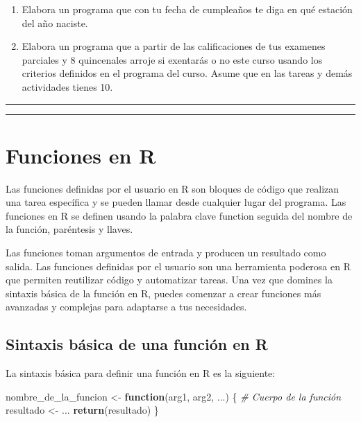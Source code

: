 \documentclass[
]{book}
\newenvironment{Shaded}{\begin{snugshade}}{\end{snugshade}}
\newcommand{\CommentTok}[1]{\textcolor[rgb]{0.56,0.35,0.01}{\textit{#1}}}
\newcommand{\ControlFlowTok}[1]{\textcolor[rgb]{0.13,0.29,0.53}{\textbf{#1}}}
\newcommand{\FunctionTok}[1]{\textcolor[rgb]{0.13,0.29,0.53}{\textbf{#1}}}
\newcommand{\NormalTok}[1]{#1}
\newcommand{\OtherTok}[1]{\textcolor[rgb]{0.56,0.35,0.01}{#1}}
\begin{document}
\begin{enumerate}
\def\labelenumi{\arabic{enumi}.}
\item
  Elabora un programa que con tu fecha de cumpleaños te diga en qué estación del año naciste.
\item
  Elabora un programa que a partir de las calificaciones de tus examenes parciales y 8 quincenales arroje si exentarás o no este curso usando los criterios definidos en el programa del curso. Asume que en las tareas y demás actividades tienes 10.
\end{enumerate}

\begin{center}\rule{0.5\linewidth}{0.5pt}\end{center}

\begin{center}\rule{0.5\linewidth}{0.5pt}\end{center}

\chapter{Funciones en R}\label{functions}

Las funciones definidas por el usuario en R son bloques de código que realizan una tarea específica y se pueden llamar desde cualquier lugar del programa. Las funciones en R se definen usando la palabra clave function seguida del nombre de la función, paréntesis y llaves.

Las funciones toman argumentos de entrada y producen un resultado como salida. Las funciones definidas por el usuario son una herramienta poderosa en R que permiten reutilizar código y automatizar tareas. Una vez que domines la sintaxis básica de la función en R, puedes comenzar a crear funciones más avanzadas y complejas para adaptarse a tus necesidades.

\section{Sintaxis básica de una función en R}\label{sintaxis-buxe1sica-de-una-funciuxf3n-en-r}

La sintaxis básica para definir una función en R es la siguiente:

\begin{Shaded}
\begin{Highlighting}[]
\NormalTok{nombre\_de\_la\_funcion }\OtherTok{\textless{}{-}} \ControlFlowTok{function}\NormalTok{(arg1, arg2, ...) \{}
  \CommentTok{\# Cuerpo de la función}
\NormalTok{  resultado }\OtherTok{\textless{}{-}}\NormalTok{ ...}
  \FunctionTok{return}\NormalTok{(resultado)}
\NormalTok{\}}
\end{Highlighting}
\end{Shaded}
\end{document}
